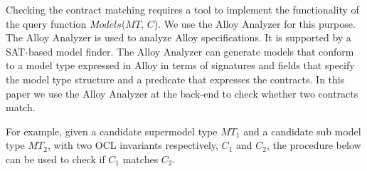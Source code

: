 Checking the contract matching requires a tool to implement the functionality of the query function $Models$($MT$, $C$).
We use the Alloy Analyzer \cite{jackson2002alloy} for this purpose. The Alloy Analyzer is used to analyze Alloy specifications. It is supported by a SAT-based model finder.
The Alloy Analyzer can generate models that conform to a model type expressed in Alloy in terms of signatures and fields that specify the model type structure and a predicate that expresses the contracts. 
In this paper we use the Alloy Analyzer at the back-end to check whether two contracts match.

For example, given a candidate supermodel type $MT_1$ and a candidate sub model type $MT_2$, with two OCL invariants respectively, $C_1$ and $C_2$, the procedure below can be used to check if $C_1$ matches $C_2$.

